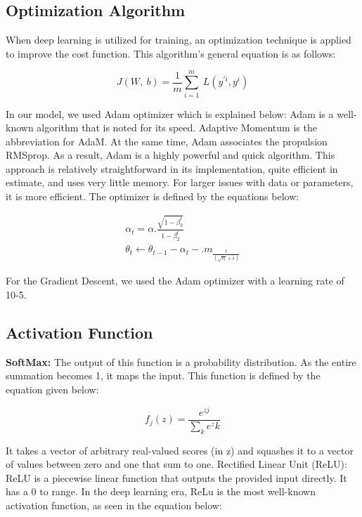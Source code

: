 \documentclass[conference]{IEEEtran}
\begin{document}
\subsection{Optimization Algorithm}

When deep learning is utilized for training, an optimization technique is applied to improve the cost function. This algorithm’s general equation is as follows:

\begin{equation*}
J(W,\ b) = \frac{1}{m}\sum_{i=1}^m\ L(y^{'i},y^i)
\end{equation*}

\noindent In our model, we used Adam optimizer which is explained below: Adam is a well-
known algorithm that is noted for its speed. Adaptive Momentum is the abbreviation for AdaM. At the same time, Adam associates the propulsion RMSprop. As a result, Adam is a highly powerful and quick algorithm. This approach is relatively straightforward in its implementation, quite efficient in estimate, and uses very little memory. For larger issues with data or parameters, it is more efficient. The optimizer is defined by the equations below:

\begin{equation*}
\begin{split}
\alpha_t = \alpha.\frac{\sqrt{1-\beta^t_2}}{1-\beta^t_2} \\
\theta_t\leftarrow\theta_{t-1}-\alpha_t-.m_{\frac{t}{(\sqrt{v_t}+\hat{\epsilon})}}
\end{split}
\end{equation*}

\noindent For the Gradient Descent, we used the Adam optimizer with a learning rate of 10-5.

\subsection{Activation Function}

\noindent \textbf{SoftMax:} The output of this function is a probability distribution. As the entire summation becomes 1, it maps the input. This function is defined by the equation given below:

\vspace{5mm}
\begin{equation*}
f_j(z)=\frac{e^{zj}}{\sum_k{e^zk}} 
\end{equation*}

\noindent It takes a vector of arbitrary real-valued scores (in z) and squashes it to a vector of values between zero and one that sum to one.
Rectified Linear Unit (ReLU): ReLU is a piecewise linear function that outputs the provided input directly. It has a 0 to range. In the deep learning era, ReLu is the most well-known activation function, as seen in the equation below:
\end{document}
